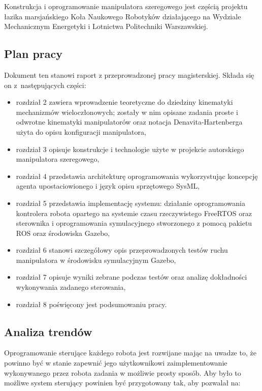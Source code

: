 \documentclass[a4paper, 12pt, twoside]{article}
\begin{document}
Konstrukcja i oprogramowanie manipulatora szeregowego jest częścią projektu łazika marsjańskiego Koła Naukowego Robotyków działającego na Wydziale Mechanicznym Energetyki i Lotnictwa Politechniki Warszawskiej.

\subsection{Plan pracy}

Dokument ten stanowi raport z przeprowadzonej pracy magisterskiej. Składa się on z~następujących części:
\begin{itemize}
\item rozdział 2 zawiera wprowadzenie teoretyczne do dziedziny kinematyki mechanizmów wieloczłonowych; zostały w nim opisane zadania proste i odwrotne kinematyki manipulatorów oraz notacja Denavita-Hartenberga użyta do opisu konfiguracji manipulatora,
\item rozdział 3 opisuje konstrukcje i technologie użyte w projekcie autorskiego manipulatora szeregowego,
\item rozdział 4 przedstawia architekturę oprogramowania wykorzystując koncepcję agenta upostaciowionego i język opisu sprzętowego SysML,
\item rozdział 5 przedstawia implementację systemu: działanie oprogramowania kontrolera robota opartego na systemie czasu rzeczywistego FreeRTOS oraz sterownika i oprogramowania symulacyjnego stworzonego z pomocą pakietu ROS oraz środowiska Gazebo,
\item rozdział 6 stanowi szczegółowy opis przeprowadzonych testów ruchu manipulatora w środowisku symulacyjnym Gazebo,
\item rozdział 7 opisuje wyniki zebrane podczas testów oraz analizę dokładności wykonywania zadanego sterowania,
\item rozdział 8 poświęcony jest podsumowaniu pracy.  
\end{itemize} 

\subsection{Analiza trendów}

Oprogramowanie sterujące każdego robota jest rozwijane mając na uwadze to, że powinno być w stanie zapewnić jego użytkownikowi zaimplementowanie wykonywanego przez robota zadania w możliwie prosty sposób. Aby było to możliwe system sterujący powinien być przygotowany tak, aby pozwalał na:
\end{document}

